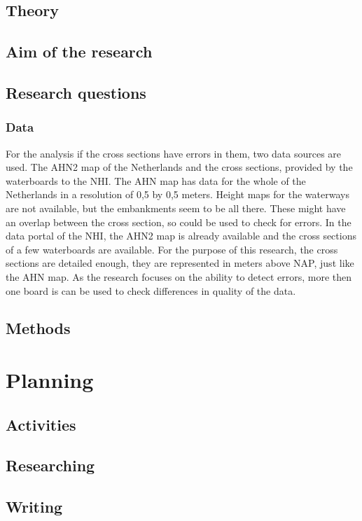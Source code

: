 \documentclass{article}
\begin{document}
\subsection{Theory}
\subsection{Aim of the research}
\subsection{Research questions}
\subsubsection{Data}
For the analysis if the cross sections have errors in them, two data sources are used.
The AHN2 map of the Netherlands and the cross sections, provided by the waterboards to the NHI.
The AHN map has data for the whole of the Netherlands in a resolution of 0,5 by 0,5 meters.
Height maps for the waterways are not available, but the embankments seem to be all there.
These might have an overlap between the cross section, so could be used to check for errors.
In the data portal of the NHI, the AHN2 map is already available and the cross sections of a few waterboards are available.
For the purpose of this research, the cross sections are detailed enough, they are represented in meters above NAP, just like the AHN map.
As the research focuses on the ability to detect errors, more then one board is can be used to check differences in quality of the data.

\subsection{Methods}
\section{Planning}
\subsection{Activities}
\subsection{Researching}
\subsection{Writing}
\newpage

\end{document}
